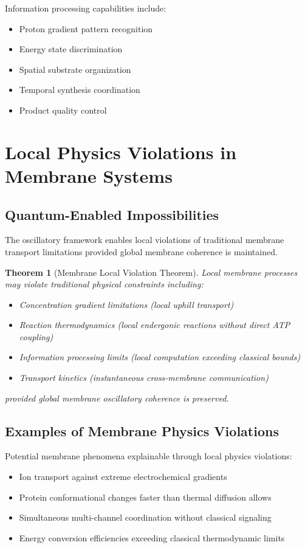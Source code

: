\documentclass[12pt,a4paper]{article}
\newtheorem{theorem}{Theorem}
\begin{document}
Information processing capabilities include:
\begin{itemize}
\item Proton gradient pattern recognition
\item Energy state discrimination  
\item Spatial substrate organization
\item Temporal synthesis coordination
\item Product quality control
\end{itemize}

\section{Local Physics Violations in Membrane Systems}

\subsection{Quantum-Enabled Impossibilities}

The oscillatory framework enables local violations of traditional membrane transport limitations provided global membrane coherence is maintained.

\begin{theorem}[Membrane Local Violation Theorem]
Local membrane processes may violate traditional physical constraints including:
\begin{itemize}
\item Concentration gradient limitations (local uphill transport)
\item Reaction thermodynamics (local endergonic reactions without direct ATP coupling)
\item Information processing limits (local computation exceeding classical bounds)
\item Transport kinetics (instantaneous cross-membrane communication)
\end{itemize}
provided global membrane oscillatory coherence is preserved.
\end{theorem}

\subsection{Examples of Membrane Physics Violations}

Potential membrane phenomena explainable through local physics violations:
\begin{itemize}
\item Ion transport against extreme electrochemical gradients
\item Protein conformational changes faster than thermal diffusion allows
\item Simultaneous multi-channel coordination without classical signaling
\item Energy conversion efficiencies exceeding classical thermodynamic limits
\end{itemize}
\end{document}
